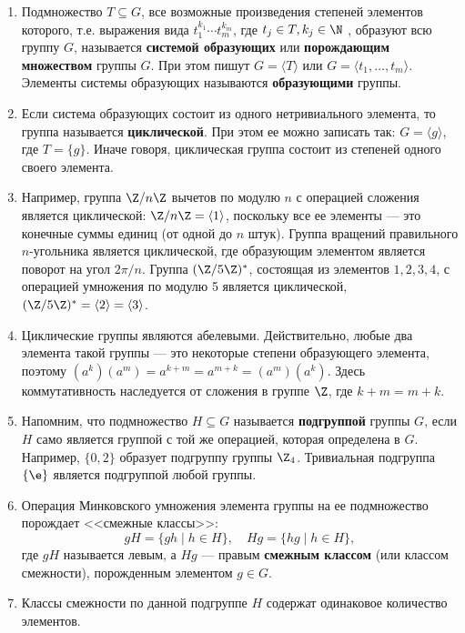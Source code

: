 \begin{enumerate}
\item Подмножество $T\subseteq G$, все возможные произведения степеней элементов которого, т.е. выражения вида $t_1^{k_1}\cdots t_m^{k_m}$, где $t_j\in T, k_j\in\N$ , образуют всю группу $G$, называется \textbf{системой образующих} или \textbf{порождающим множеством} группы $G$. При этом пишут $G=\langle T\rangle$ или $G=\langle t_1,\dots,t_m\rangle$. Элементы системы образующих называются \textbf{образующими} группы.
\item Если система образующих состоит из одного нетривиального элемента, то группа называется \textbf{циклической}. При этом ее можно записать так: $G=\langle g\rangle$, где $T=\{g\}$. Иначе говоря, циклическая группа состоит из степеней одного своего элемента.
\item Например, группа $\Z/n\Z$ вычетов по модулю $n$ с операцией сложения является циклической: $\Z/n\Z=\langle 1\rangle$, поскольку все ее элементы --- это конечные суммы единиц (от одной до $n$ штук). Группа вращений правильного $n$-угольника является циклической, где образующим элементом является поворот на угол $2\pi/n$. Группа $(\Z/5\Z)^*$, состоящая из элементов $1,2,3,4$, с операцией умножения по модулю 5 является циклической, $(\Z/5\Z)^*=\langle 2\rangle=\langle 3\rangle$.
\item Циклические группы являются абелевыми. Действительно, любые два элемента такой группы --- это некоторые степени образующего элемента, поэтому $(a^k)(a^m)=a^{k+m}=a^{m+k}=(a^m)(a^k)$. Здесь коммутативность наследуется от сложения в группе $\Z$, где $k+m=m+k$.


\item Напомним, что подмножество $H\subseteq G$ называется \textbf{подгруппой} группы $G$, если $H$ само является группой с той же операцией, которая определена в $G$. Например, $\{0,2\}$ образует подгруппу группы $\Z_4$. Тривиальная подгруппа $\{\e\}$ является подгруппой любой группы.

\item Операция Минковского умножения элемента группы на ее подмножество порождает <<смежные классы>>:
$$
gH=\{gh\mid h\in H\},\quad Hg=\{hg\mid h\in H\},
$$
где $gH$ называется левым, а $Hg$ --- правым \textbf{смежным классом} (или классом смежности), порожденным элементом $g\in G$.

\item Классы смежности по данной подгруппе $H$ содержат одинаковое количество элементов.


\end{enumerate}
